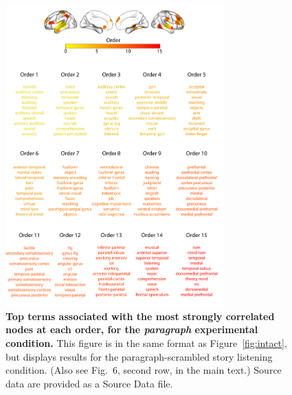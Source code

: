 \documentclass[english]{article}
\newcommand{\neurosynth}{6}
\begin{document}
\begin{figure}[p!]
\centering
\includegraphics[width=0.75\textwidth]{figs/supp_15_paragraph}
\caption{\textbf{Top terms associated with the most strongly
      correlated nodes at each order, for the \textit{paragraph} experimental
    condition.}  This figure is in the same format as
  Figure~\ref{fig:intact}, but displays results for the
  paragraph-scrambled story listening condition.  (Also see Fig.~\neurosynth,
second row, in the main text.) Source data are provided as a Source Data file.}
\label{fig:paragraph}
\end{figure}
\end{document}
